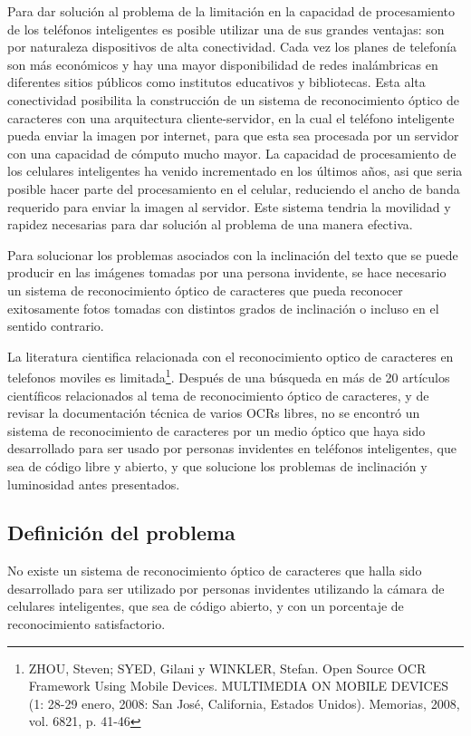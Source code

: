 \documentclass[a4paper, 11pt, oneside]{report}
\begin{document}
Para dar solución al problema de la limitación en la capacidad de procesamiento de los teléfonos inteligentes es posible utilizar una de sus grandes ventajas: son por naturaleza dispositivos de alta conectividad. Cada vez los planes de telefonía son más económicos y hay una mayor disponibilidad de redes inalámbricas en diferentes sitios públicos como institutos educativos y bibliotecas. Esta alta conectividad posibilita la construcción de un sistema de reconocimiento óptico de caracteres con una arquitectura cliente-servidor, en la cual el teléfono inteligente pueda enviar la imagen por internet, para que esta sea procesada por un servidor con una capacidad de cómputo mucho mayor. La capacidad de procesamiento de los celulares inteligentes ha venido incrementado en los últimos años, asi que seria posible hacer parte del procesamiento en el celular, reduciendo el ancho de banda requerido para enviar la imagen al servidor. Este sistema tendria la movilidad y rapidez necesarias para dar solución al problema de una manera efectiva.

Para solucionar los problemas asociados con la inclinación del texto que se puede producir en las imágenes tomadas por una persona invidente, se hace necesario un sistema de reconocimiento óptico de caracteres que pueda reconocer exitosamente fotos tomadas con distintos grados de inclinación o incluso en el sentido contrario.

La literatura cientifica relacionada con el reconocimiento optico de caracteres en telefonos moviles es limitada\footnote{ZHOU, Steven; SYED, Gilani y WINKLER, Stefan. Open Source OCR Framework Using Mobile Devices. MULTIMEDIA ON MOBILE DEVICES (1: 28-29 enero, 2008: San José, California, Estados Unidos). Memorias, 2008, vol. 6821, p. 41-46}. Después de una búsqueda en más de 20 artículos científicos relacionados al tema de reconocimiento óptico de caracteres, y de revisar la documentación técnica de varios OCRs libres, no se encontró un sistema de reconocimiento de caracteres por un medio óptico que haya sido desarrollado para ser usado por personas invidentes en teléfonos inteligentes, que sea de código libre y abierto, y que solucione los problemas de inclinación y luminosidad antes presentados.

\subsection{Definición del problema}

No existe un sistema de reconocimiento óptico de caracteres que halla sido desarrollado para ser utilizado por personas invidentes utilizando la cámara de celulares inteligentes, que sea de código abierto, y con un porcentaje de reconocimiento satisfactorio.
\end{document}

